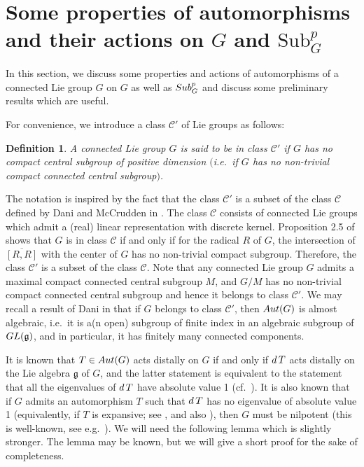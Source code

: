 \documentclass{amsart}
\numberwithin{equation}{section}
\newcommand{\Aut}{{\rm Aut}}
\newcommand{\gf}{{\mathfrak g}}
\newcommand{\spg}{{\rm Sub}^p_G}
\newcommand{\du}{{\rm d\,}}
\newcommand{\GL}{{\rm GL}}
\let\ol=\overline
\newtheorem{defn}[thm]{Definition}
\theoremstyle{remark}
\newcommand{\cp}{{\mathcal{C}'}}
\begin{document}
\section{Some properties of automorphisms and their actions on \texorpdfstring{$G$}{G} and \texorpdfstring{${\mathrm{Sub}}^p_G$}{Sub p G}}

In this section, we discuss some properties and actions of automorphisms of a connected Lie group 
$G$ on $G$ as well as $\spg$ and discuss some preliminary results which are useful. 

For convenience, we introduce a class $\cp$ of Lie groups as follows:

\begin{defn}
A connected Lie group $G$ is said to be in class $\cp$ if $G$ has no compact central subgroup 
of positive dimension $($i.e.\ if $G$ has no non-trivial compact connected central subgroup$)$.
\end{defn} 

The notation is inspired by the fact that the class $\cp$ is a subset of the class $\mathcal{C}$ 
defined by Dani and McCrudden in \cite{DM}. The class $\mathcal{C}$ consists of connected Lie groups 
which admit a (real) linear representation with discrete kernel. Proposition 2.5 of \cite{DM} 
shows that $G$ is in class $\mathcal{C}$ if and only if for the radical $R$ of $G$, the 
intersection of $\ol{[R,R]}$ with the center of $G$ has no non-trivial compact subgroup. 
Therefore, the class $\cp$ is a subset of the class $\mathcal{C}$. Note that any connected Lie group 
$G$ admits a maximal compact connected central subgroup $M$, and $G/M$ has no 
non-trivial compact connected central subgroup and hence it belongs to class $\cp$. We may recall 
a result of Dani in \cite{D} that if $G$ belongs to class $\cp$, then $\Aut(G)$ is almost algebraic, i.e.\ 
it is a(n open) subgroup of finite index in an algebraic subgroup of $\GL(\gf)$, and in particular,  
it has finitely many connected components. 

It is known that $T\in\Aut(G)$ acts distally on $G$ if and only if $\du T$ acts distally on the Lie algebra $\gf$ of $G$, 
and the latter statement is equivalent to the statement that all the eigenvalues of $\du T$ have absolute value 1 
(cf.\ \cite{Ab2}). It is also known that if $G$ admits an automorphism $T$ such that $\du T$ has no 
eigenvalue of absolute value 1 (equivalently, if $T$ is expansive; see \cite{Sh2}, and also \cite{Bh}), then $G$ must 
be nilpotent (this is well-known, see e.g.\ \cite{Sh2}). We will need the following lemma which is slightly stronger. 
The lemma may be known, but we will give a short proof for the sake of completeness. 
\end{document}
